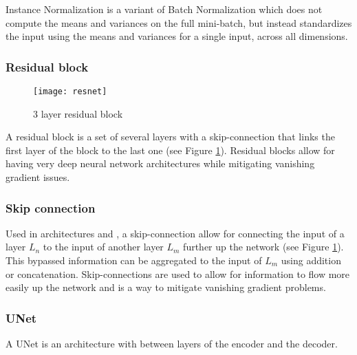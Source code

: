 Instance Normalization \citep{Ulyanov2016} is a variant of Batch Normalization which does not compute the means and variances on the full mini-batch, but instead standardizes the input using the means and variances for a single input, across all dimensions.

\subsubsection*{Residual block} \label{gl:resblock}

\begin{figure}
	\centering
	\texttt{[image: resnet]}
	\caption{3 layer residual block}
	\label{fig:resblock}
\end{figure}

A residual block is a set of several layers with a skip-connection that links the first layer of the block to the last one (see Figure \ref{fig:resblock}). Residual blocks allow for having very deep neural network architectures while mitigating vanishing gradient issues.

\subsubsection*{Skip connection} \label{gl:skip}

Used in  architectures and , a skip-connection allow for connecting the input of a layer $L_n$ to the input of another layer $L_m$ further up the network (see Figure \ref{fig:resblock}). This bypassed information can be aggregated to the input of $L_m$ using addition or concatenation. Skip-connections are used to allow for information to flow more easily up the network and is a way to mitigate vanishing gradient problems.

\subsubsection*{UNet} \label{gl:unet} A UNet  \citep{Ronneberger2015} is an  architecture with  between layers of the encoder and the decoder.